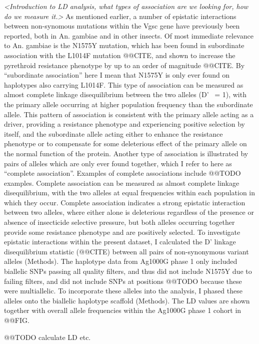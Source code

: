 \documentclass[a4paper,11pt,abstracton,hidelinks]{scrartcl}
\begin{document}
\textit{<Introduction to LD analysis, what types of association are we looking for, how do we measure it.>}
%
As mentioned earlier, a number of epistatic interactions between non-synomous mutations within the Vgsc gene have previously been reported, both in An. gambiae and in other insects.
%
Of most immediate relevance to An. gambiae is the N1575Y mutation, which has been found in subordinate association with the L1014F mutation @@CITE, and shown to increase the pyrethroid resistance phenotype by up to an order of magnitude @@CITE.
%
By ``subordinate association'' here I mean that N1575Y is only ever found on haplotypes also carrying L1014F.
%
This type of association can be measured as almost complete linkage disequilibrium between the two alleles (D' ~= 1), with the primary allele occurring at higher population frequency than the subordinate allele.
%
This pattern of association is consistent with the primary allele acting as a driver, providing a resistance phenotype and experiencing positive selection by itself, and the subordinate allele acting either to enhance the resistance phenotype or to compensate for some deleterious effect of the primary allele on the normal function of the protein.
%
Another type of association is illustrated by pairs of alleles which are only ever found together, which I refer to here as ``complete association''.
%
Examples of complete associations include @@TODO examples.
%
Complete association can be measured as almost complete linkage disequilibrium, with the two alleles at equal frequencies within each population in which they occur.
%
Complete association indicates a strong epistatic interaction between two alleles, where either alone is deleterious regardless of the presence or absence of insecticide selective pressure, but both alleles occurring together provide some resistance phenotype and are positively selected.
%
To investigate epistatic interactions within the present dataset, I calculated the D' linkage disequilibrium statistic (@@CITE) between all pairs of non-synonymous variant alleles (Methods).
%
The haplotype data from Ag1000G phase 1 only included biallelic SNPs passing all quality filters, and thus did not include N1575Y due to failing filters, and did not include SNPs at positions @@TODO because these were multiallelic.
%
To incorporate these alleles into the analysis, I phased these alleles onto the biallelic haplotype scaffold (Methods).
%
The LD values are shown together with overall allele frequencies within the Ag1000G phase 1 cohort in @@FIG.
%

@@TODO calculate LD etc.
\end{document}
